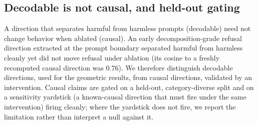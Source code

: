 \subsection{Decodable is not causal, and held-out gating}\label{decodable-is-not-causal-and-held-out-gating}

A direction that separates harmful from harmless prompts (decodable) need not change
behavior when ablated (causal). An early decomposition-grade refusal direction
extracted at the prompt boundary separated harmful from harmless cleanly yet did
not move refusal under ablation (its cosine to a freshly recomputed causal direction
was \(0.76\)). We therefore distinguish decodable directions, used for the geometric
results, from causal directions, validated by an intervention. Causal claims are
gated on a held-out, category-diverse split and on a sensitivity yardstick (a
known-causal direction that must fire under the same intervention) firing cleanly;
where the yardstick does not fire, we report the limitation rather than interpret a
null against it.
